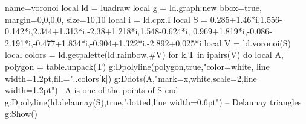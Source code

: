 \begin{luadraw}{name=voronoi}
local ld = luadraw
local g = ld.graph:new{ bbox=true, margin={0,0,0,0}, size={10,10}}
local i = ld.cpx.I
local S = {0.285+1.46*i,1.556-0.142*i,2.344+1.313*i,-2.38+1.218*i,1.548-0.624*i,
0.969+1.819*i,-0.086-2.191*i,-0.477+1.834*i,-0.904+1.322*i,-2.892+0.025*i}
local V = ld.voronoi(S)
local colors = ld.getpalette(ld.rainbow,#V)
for k,T in ipairs(V) do
    local A, polygon = table.unpack(T)
    g:Dpolyline(polygon,true,"color=white, line width=1.2pt,fill="..colors[k])
    g:Ddots(A,"mark=x,white,scale=2,line width=1.2pt")-- A is one of the points of S
end
g:Dpolyline(ld.delaunay(S),true,"dotted,line width=0.6pt") -- Delaunay triangles
g:Show()
\end{luadraw}
